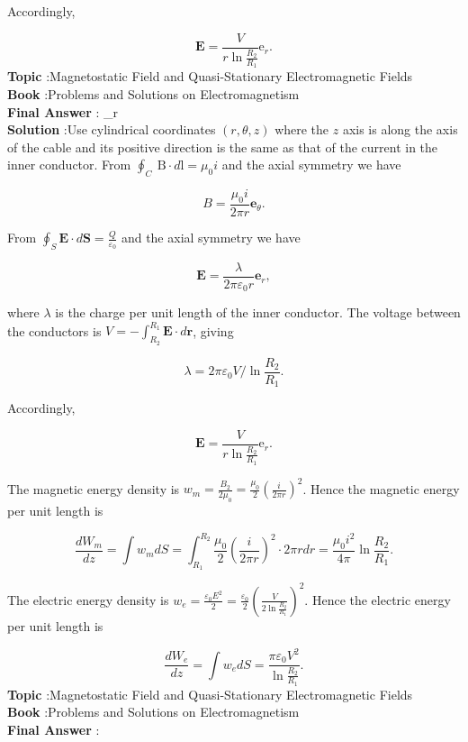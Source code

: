 \documentclass[10pt]{article}
\begin{document}
Accordingly,

$$
\mathbf{E}=\frac{V}{r \ln \frac{R_{2}}{R_{1}}} \mathrm{e}_{r} .
$$
\textbf{Topic} :Magnetostatic Field and Quasi-Stationary Electromagnetic Fields\\
\textbf{Book} :Problems and Solutions on Electromagnetism\\
\textbf{Final Answer} : _{r}\\


\textbf{Solution} :Use cylindrical coordinates $(r, \theta, z)$ where the $z$ axis is along the axis of the cable and its positive direction is the same as that of the current in the inner conductor. From $\oint_{C} \mathrm{~B} \cdot d \mathrm{l}=\mu_{0} i$ and the axial symmetry we have

$$
B=\frac{\mu_{0} i}{2 \pi r} \mathbf{e}_{\theta} .
$$

From $\oint_{S} \mathbf{E} \cdot d \mathbf{S}=\frac{Q}{\varepsilon_{0}}$ and the axial symmetry we have

$$
\mathbf{E}=\frac{\lambda}{2 \pi \varepsilon_{0} r} \mathbf{e}_{r},
$$

where $\lambda$ is the charge per unit length of the inner conductor. The voltage between the conductors is $V=-\int_{R_{2}}^{R_{1}} \mathbf{E} \cdot d \mathbf{r}$, giving

$$
\lambda=2 \pi \varepsilon_{0} V / \ln \frac{R_{2}}{R_{1}} .
$$

Accordingly,

$$
\mathbf{E}=\frac{V}{r \ln \frac{R_{2}}{R_{1}}} \mathrm{e}_{r} .
$$

 The magnetic energy density is $w_{m}=\frac{B_{2}}{2 \mu_{0}}=\frac{\mu_{0}}{2}\left(\frac{i}{2 \pi r}\right)^{2}$. Hence the magnetic energy per unit length is

$$
\frac{d W_{m}}{d z}=\int w_{m} d S=\int_{R_{1}}^{R_{2}} \frac{\mu_{0}}{2}\left(\frac{i}{2 \pi r}\right)^{2} \cdot 2 \pi r d r=\frac{\mu_{0} i^{2}}{4 \pi} \ln \frac{R_{2}}{R_{1}} .
$$

The electric energy density is $w_{e}=\frac{\varepsilon_{0} E^{2}}{2}=\frac{\varepsilon_{0}}{2}\left(\frac{V}{2 \ln \frac{R_{2}}{R_{1}}}\right)^{2}$. Hence the electric energy per unit length is

$$
\frac{d W_{e}}{d z}=\int w_{e} d S=\frac{\pi \varepsilon_{0} V^{2}}{\ln \frac{R_{2}}{R_{1}}} .
$$
\textbf{Topic} :Magnetostatic Field and Quasi-Stationary Electromagnetic Fields\\
\textbf{Book} :Problems and Solutions on Electromagnetism\\
\textbf{Final Answer} :\\
\end{document}
